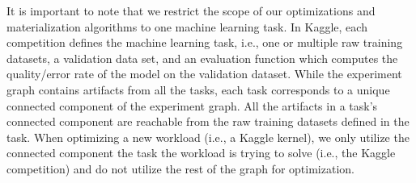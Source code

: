 It is important to note that we restrict the scope of our optimizations and materialization algorithms to one machine learning task. 
In Kaggle, each competition defines the machine learning task, i.e., one or multiple raw training datasets, a validation data set, and an evaluation function which computes the quality/error rate of the model on the validation dataset.
While the experiment graph contains artifacts from all the tasks, each task corresponds to a unique connected component of the experiment graph.
All the artifacts in a task's connected component are reachable from the raw training datasets defined in the task.
When optimizing a new workload (i.e., a Kaggle kernel), we only utilize the connected component the task the workload is trying to solve (i.e., the Kaggle competition) and do not utilize the rest of the graph for optimization.

